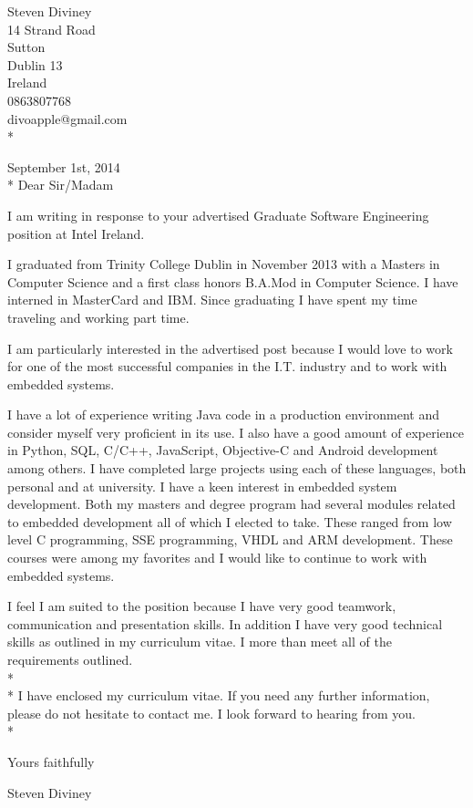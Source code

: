 \documentclass{res}
\begin{document}
 
\begin{resume}

\begin{flushright}
   Steven Diviney \\
   14 Strand Road \\
   Sutton \\
   Dublin 13 \\
   Ireland \\
   0863807768 \\
   divoapple@gmail.com \\* \vspace{10 mm}
\end{flushright}
\begin{flushleft}
 
September 1st, 2014\\*\vspace{10 mm}
Dear Sir/Madam
\end{flushleft}

I am writing in response to your advertised Graduate Software Engineering position at Intel Ireland.

I graduated from Trinity College Dublin in November 2013 with a Masters in Computer Science and a first class honors B.A.Mod in Computer Science. I have interned in MasterCard and IBM. Since graduating I have spent my time traveling and working part time.

I am particularly interested in the advertised post because I would love to work for one of the most successful companies in the I.T. industry and to work with embedded systems.

I have a lot of experience writing Java code in a production environment and consider myself very proficient in its use. I also have a good amount of experience in Python, SQL, C/C++, JavaScript, Objective-C and Android development among others. I have completed large projects using each of these languages, both personal and at university. I have a keen interest in embedded system development. Both my masters and degree program had several modules related to embedded development all of which I elected to take. These ranged from low level C programming, SSE programming, VHDL and ARM development. These courses were among my favorites and I would like to continue to work with embedded systems.

I feel I am suited to the position because I have very good teamwork, communication and presentation skills. In addition I have very good technical skills as outlined in my curriculum vitae. I more than meet all of the requirements outlined.
\\*
\\*
I have enclosed my curriculum vitae. If you need any further information, please do not hesitate to contact me. I look forward to hearing from you.\\*

\begin{flushleft}
Yours faithfully\\\vspace{10mm}

Steven Diviney\\
\end{flushleft}

\end{resume}
\end{document}
